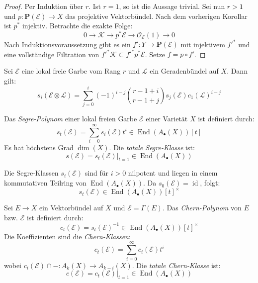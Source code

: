 \documentclass[10pt,b5paper]{article}
\begin{document}
\begin{proof}
Per Induktion über $r$. Ist $r=1$, so ist die Aussage trivial. Sei nun $r>1$ und $p: \mathbf{P}(\mathcal{E})\to X$ das projektive Vektorbündel. Nach dem vorherigen Korollar ist $p^\ast$ injektiv. Betrachte die exakte Folge: 
\[0 \longrightarrow \mathcal{K} \longrightarrow p^\ast\mathcal{E}\longrightarrow \mathcal{O}_\mathcal{E}(1) \longrightarrow 0\]
Nach Induktionsvoraussetzung gibt es ein $f': Y\to\mathbf{P}(\mathcal{E})$ mit injektivem $f'^\ast$ und eine vollständige Filtration von $f'^\ast\mathcal{K} \subset f'^\ast p^\ast\mathcal{E}$. Setze $f = p\circ f'$.
\end{proof}

\begin{proposition}
Sei $\mathcal{E}$ eine lokal freie Garbe vom Rang $r$ und $\mathcal{L}$ ein Geradenbündel auf $X$. Dann gilt:
\[ s_i(\mathcal{E}\otimes\mathcal{L}) = \sum_{j=0}^i(-1)^{i-j} \binom{r-1+i}{r-1+j}s_j(\mathcal{E}) c_1(\mathcal{L})^{i-j} \]
\end{proposition}

\begin{definition}
Das \textit{Segre-Polynom} einer lokal freien Garbe $\mathcal{E}$ einer Varietät $X$ ist definiert durch:
\[ s_t(\mathcal{E}) = \sum_{i = 0}^\infty s_i(\mathcal{E})t^i \in\operatorname{End}(A_\bullet(X))[t] \]
Es hat höchstens Grad $\dim(X)$. Die \textit{totale Segre-Klasse} ist:
\[ s(\mathcal{E}) = s_t(\mathcal{E})|_{t = 1} \in\operatorname{End}(A_\bullet(X)) \]
\end{definition}

\begin{remark}
Die Segre-Klassen $s_i(\mathcal{E})$ sind für $i>0$  nilpotent und liegen in einem kommutativen Teilring von $\operatorname{End}(A_\bullet(X))$. Da $s_0(\mathcal{E}) = \operatorname{id}$, folgt:
\[ s_t(\mathcal{E}) \in\operatorname{End}(A_\bullet(X))[t]^\times \]
\end{remark}

\begin{definition}
Sei $E\to X$ ein Vektorbündel auf $X$ und $\mathcal{E} = \Gamma(E)$. Das \textit{Chern-Polynom} von $E$ bzw. $\mathcal{E}$ ist definiert durch:
\[ c_t(\mathcal{E}) = s_t(\mathcal{E})^{-1} \in\operatorname{End}(A_\bullet(X))[t]^\times \]
Die Koeffizienten sind die \textit{Chern-Klassen}:   
\[ c_t(\mathcal{E}) = \sum_{i =0}^\infty c_i(\mathcal{E}) t^i \]
wobei $c_i(\mathcal{E})\cap - : A_k(X)\to A_{k-i}(X)$. Die \textit{totale Chern-Klasse} ist:
\[ c(\mathcal{E}) = c_t(\mathcal{E})|_{t =1}\in\operatorname{End}(A_\bullet(X)) \]
\end{definition}
\end{document}
